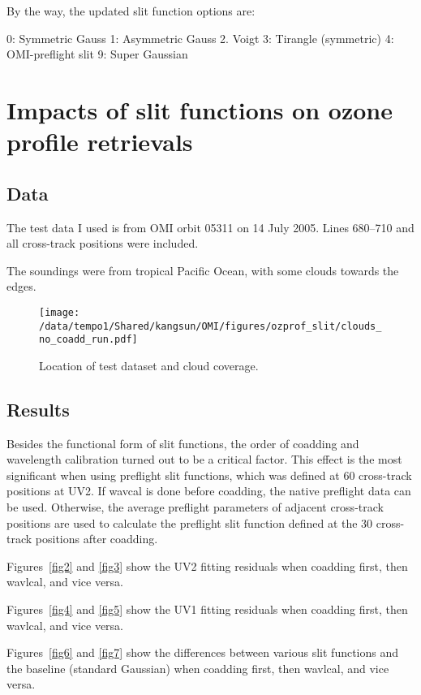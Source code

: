 \documentclass[hidelinks,12pt]{article}
\begin{document}
By the way, the updated slit function options are:

0: Symmetric Gauss 1: Asymmetric Gauss  2. Voigt  3: Tirangle (symmetric) 4: OMI-preflight slit 9: Super Gaussian

\section{Impacts of slit functions on ozone profile retrievals}

\subsection{Data}
The test data I used is from OMI orbit 05311 on 14 July 2005. Lines 680--710 and all cross-track positions were included.

The soundings were from tropical Pacific Ocean, with some clouds towards the edges.%

\begin{figure}[hbtp]
  \begin{center}
    \texttt{[image: /data/tempo1/Shared/kangsun/OMI/figures/ozprof\_slit/clouds\_no\_coadd\_run.pdf]}
  \caption{Location of test dataset and cloud coverage.}
    \label{fig1}
  \end{center}
\end{figure}

\subsection{Results}
Besides the functional form of slit functions, the order of coadding and wavelength calibration turned out to be a critical factor. This effect is the most significant when using preflight slit functions, which was defined at 60 cross-track positions at UV2. If wavcal is done before coadding, the native preflight data can be used. Otherwise, the average preflight parameters of adjacent cross-track positions are used to calculate the preflight slit function defined at the 30 cross-track positions after coadding.

Figures~\ref{fig2} and \ref{fig3} show the UV2 fitting residuals when coadding first, then wavlcal, and vice versa.

Figures~\ref{fig4} and \ref{fig5} show the UV1 fitting residuals when coadding first, then wavlcal, and vice versa.

Figures~\ref{fig6} and \ref{fig7} show the differences between various slit functions and the baseline (standard Gaussian) when coadding first, then wavlcal, and vice versa.
\end{document}
